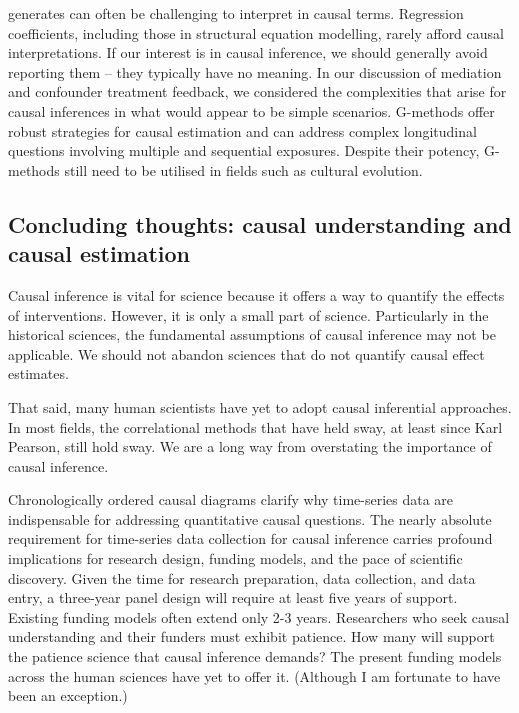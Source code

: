 \documentclass[
  singlecolumn]{report}
\begin{document}
\begin{enumerate}
  generates can often be challenging to interpret in causal terms.
  Regression coefficients, including those in structural equation
  modelling, rarely afford causal interpretations. If our interest is in
  causal inference, we should generally avoid reporting them -- they
  typically have no meaning. In our discussion of mediation and
  confounder treatment feedback, we considered the complexities that
  arise for causal inferences in what would appear to be simple
  scenarios. G-methods offer robust strategies for causal estimation and
  can address complex longitudinal questions involving multiple and
  sequential exposures. Despite their potency, G-methods still need to
  be utilised in fields such as cultural evolution.
\end{enumerate}

\hypertarget{concluding-thoughts-causal-understanding-and-causal-estimation}{%
\subsection{Concluding thoughts: causal understanding and causal
estimation}\label{concluding-thoughts-causal-understanding-and-causal-estimation}}

Causal inference is vital for science because it offers a way to
quantify the effects of interventions. However, it is only a small part
of science. Particularly in the historical sciences, the fundamental
assumptions of causal inference may not be applicable. We should not
abandon sciences that do not quantify causal effect estimates.

That said, many human scientists have yet to adopt causal inferential
approaches. In most fields, the correlational methods that have held
sway, at least since Karl Pearson, still hold sway. We are a long way
from overstating the importance of causal inference.

Chronologically ordered causal diagrams clarify why time-series data are
indispensable for addressing quantitative causal questions. The nearly
absolute requirement for time-series data collection for causal
inference carries profound implications for research design, funding
models, and the pace of scientific discovery. Given the time for
research preparation, data collection, and data entry, a three-year
panel design will require at least five years of support. Existing
funding models often extend only 2-3 years. Researchers who seek causal
understanding and their funders must exhibit patience. How many will
support the patience science that causal inference demands? The present
funding models across the human sciences have yet to offer it. (Although
I am fortunate to have been an exception.)
\end{document}

